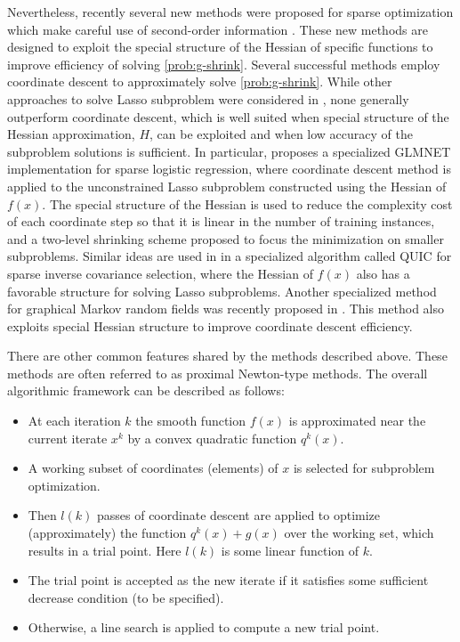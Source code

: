 \documentclass[11pt]{article}
\numberwithin{equation}{section}
\begin{document}
Nevertheless, recently several new methods were proposed for sparse optimization which make careful use of second-order information \cite{Hsieh2011,nGLMNET,Olsen2012,Chin2012}. 
These new methods are designed to exploit the special structure of the Hessian of  specific functions to improve  efficiency of  solving \eqref{prob:g-shrink}. Several successful methods employ coordinate descent to approximately solve   \eqref{prob:g-shrink}. While other approaches to solve Lasso subproblem were considered in 
\cite{Chin2012},  none generally outperform coordinate descent, which is well suited when special structure of the Hessian approximation, $H$,
 can be exploited and when low accuracy of the subproblem solutions is sufficient. 
In particular, \cite{nGLMNET} proposes a specialized GLMNET \cite{GLMNET} implementation for sparse logistic regression, where coordinate descent method is applied to the unconstrained Lasso subproblem constructed using the Hessian of $f(x)$. The special structure of the Hessian is used to reduce the complexity cost of each coordinate step so that it is linear in the number of training instances, and a two-level shrinking scheme proposed to focus the minimization on  smaller subproblems. Similar ideas are used in \cite{Hsieh2011} in a specialized algorithm called QUIC for sparse inverse covariance selection, where the Hessian of $f(x)$ also has a favorable structure for solving Lasso subproblems.
Another specialized method for graphical Markov random fields  was recently proposed in \cite{icml2013_wytock13}. This method also exploits special Hessian structure to improve coordinate descent efficiency. 

There are other common features shared by the  methods described above. These methods are often referred to as proximal Newton-type methods.
 The overall algorithmic framework can be described as follows:
\begin{itemize}
\item At each  iteration $k$ the smooth function $f(x)$ is approximated near the current iterate $x^k$ by a convex quadratic function $q^k(x)$. 
\item A working subset of coordinates (elements) of $x$ is selected for subproblem optimization. 
\item Then $l(k)$ passes of coordinate descent are applied   to optimize (approximately) 
the function $q^k(x)+g(x)$ over the working set, which results in a trial point. Here $l(k)$ is some linear function of $k$.
\item The trial point is  accepted as the new iterate if it satisfies some sufficient decrease condition (to be specified).
\item Otherwise,  a line search is applied to compute a new trial point. 
\end{itemize}
\end{document}
